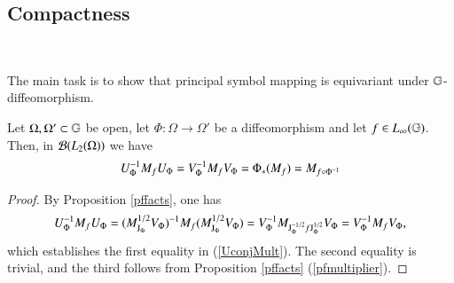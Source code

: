 \documentclass[leqno]{amsart}
\begin{document}
%	
%		
%	 
	
	
	\subsection{Compactness \expandafter{}}
	\
	\newline
	
	
	
	
	The main task is to show that principal symbol mapping is equivariant under $\mathbb{G}$-diffeomorphism.
	
	\begin{lemma}\label{multiplication}
		Let $\Omega, \Omega'\subset\mathbb{G}$ be open, let $\Phi:\Omega\to\Omega'$ be a diffeomorphism and let $f\in L_{\infty}(\mathbb{G})$. Then, in ${\mathcal B}(L_2(\Omega))$ we have
		\begin{equation}\label{UconjMult}
			U_{\Phi}^{-1} M_{f}U_{\Phi}=V_{\Phi}^{-1} M_{f}V_{\Phi}=\Phi_*(M_f)=M_{f\circ\Phi^{-1}}
		\end{equation}
	\end{lemma}
	\begin{proof}
		By Proposition \ref{pffacts}, one has
		$$U_{\Phi}^{-1} M_{f}U_{\Phi}=(M_{\mathrm J_{\Phi}}^{1/2}V_{\Phi})^{-1} M_{f}(M_{\mathrm J_{\Phi}}^{1/2}V_{\Phi})=V_{\Phi}^{-1} M_{\mathrm J_{\Phi}^{-1/2}f\mathrm J_{\Phi}^{1/2}}V_{\Phi}=V_{\Phi}^{-1} M_{f}V_{\Phi},$$
		which establishes the first equality in (\ref{UconjMult}). The second equality is trivial, and the third follows from Proposition \ref{pffacts} (\ref{pfmultiplier}).
	\end{proof}
	
\end{document}
